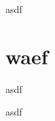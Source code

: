 \documentclass[a4paper,12pt]{scrreprt}
\begin{document}
\pagestyle{empty}
\setlength{\parindent}{0em}




\newpage

asdf
\chapter{waef}
\newpage

asdf
\newpage

asdf
\end{document}
